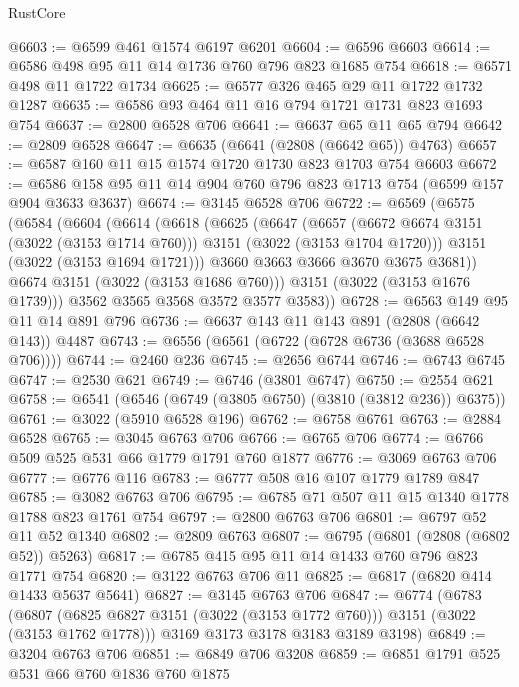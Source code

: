 \begin{lexlean}{RustCore}
\begin{coremodule}
@6603 := @6599 @461 @1574 @6197 @6201
@6604 := @6596 @6603
@6614 := @6586 @498 @95 @11 @14 @1736 @760 @796 @823 @1685 @754
@6618 := @6571 @498 @11 @1722 @1734
@6625 := @6577 @326 @465 @29 @11 @1722 @1732 @1287
@6635 := @6586 @93 @464 @11 @16 @794 @1721 @1731 @823 @1693 @754
@6637 := @2800 @6528 @706
@6641 := @6637 @65 @11 @65 @794
@6642 := @2809 @6528
@6647 := @6635 (@6641 (@2808 (@6642 @65)) @4763)
@6657 := @6587 @160 @11 @15 @1574 @1720 @1730 @823 @1703 @754 @6603
@6672 := @6586 @158 @95 @11 @14 @904 @760 @796 @823 @1713 @754 (@6599 @157 @904 @3633 @3637)
@6674 := @3145 @6528 @706
@6722 := @6569
    (@6575
      (@6584
        (@6604
          (@6614
            (@6618
              (@6625
                (@6647
                  (@6657
                    (@6672 @6674 @3151 (@3022 (@3153 @1714 @760)))
                    @3151
                    (@3022 (@3153 @1704 @1720)))
                  @3151
                  (@3022 (@3153 @1694 @1721)))
                @3660
                @3663
                @3666
                @3670
                @3675
                @3681))
            @6674
            @3151
            (@3022 (@3153 @1686 @760)))
          @3151
          (@3022 (@3153 @1676 @1739)))
        @3562
        @3565
        @3568
        @3572
        @3577
        @3583))
@6728 := @6563 @149 @95 @11 @14 @891 @796
@6736 := @6637 @143 @11 @143 @891 (@2808 (@6642 @143)) @4487
@6743 := @6556 (@6561 (@6722 (@6728 @6736 (@3688 @6528 @706))))
@6744 := @2460 @236
@6745 := @2656 @6744
@6746 := @6743 @6745
@6747 := @2530 @621
@6749 := @6746 (@3801 @6747)
@6750 := @2554 @621
@6758 := @6541 (@6546 (@6749 (@3805 @6750) (@3810 (@3812 @236)) @6375))
@6761 := @3022 (@5910 @6528 @196)
@6762 := @6758 @6761
@6763 := @2884 @6528
@6765 := @3045 @6763 @706
@6766 := @6765 @706
@6774 := @6766 @509 @525 @531 @66 @1779 @1791 @760 @1877
@6776 := @3069 @6763 @706
@6777 := @6776 @116
@6783 := @6777 @508 @16 @107 @1779 @1789 @847
@6785 := @3082 @6763 @706
@6795 := @6785 @71 @507 @11 @15 @1340 @1778 @1788 @823 @1761 @754
@6797 := @2800 @6763 @706
@6801 := @6797 @52 @11 @52 @1340
@6802 := @2809 @6763
@6807 := @6795 (@6801 (@2808 (@6802 @52)) @5263)
@6817 := @6785 @415 @95 @11 @14 @1433 @760 @796 @823 @1771 @754
@6820 := @3122 @6763 @706 @11
@6825 := @6817 (@6820 @414 @1433 @5637 @5641)
@6827 := @3145 @6763 @706
@6847 := @6774
    (@6783
      (@6807 (@6825 @6827 @3151 (@3022 (@3153 @1772 @760))) @3151 (@3022 (@3153 @1762 @1778)))
      @3169
      @3173
      @3178
      @3183
      @3189
      @3198)
@6849 := @3204 @6763 @706
@6851 := @6849 @706 @3208
@6859 := @6851 @1791 @525 @531 @66 @760 @1836 @760 @1875

\end{coremodule}
\end{lexlean}
